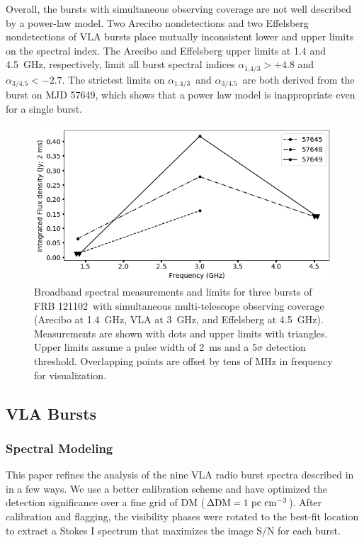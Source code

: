 \documentclass[twocolumn]{aastex61}
\newcommand{\frb}{FRB 121102}
\begin{document}
Overall, the bursts with simultaneous observing coverage are not well described by a power-law model. Two Arecibo nondetections and two Effelsberg nondetections of VLA bursts place mutually inconsistent lower and upper limits on the spectral index. The Arecibo and Effelsberg upper limits at 1.4 and 4.5~GHz, respectively, limit all burst spectral indices $\alpha_{1.4/3}>+4.8$ and $\alpha_{3/4.5}<-2.7$. The strictest limits on $\alpha_{1.4/3}$\ and $\alpha_{3/4.5}$\ are both derived from the burst on MJD 57649, which shows that a power law model is inappropriate even for a single burst.

\begin{figure}[htb]
\begin{center}
 \includegraphics[width=\columnwidth]{multispec.png}
 \caption{Broadband spectral measurements and limits for three bursts of \frb\ with simultaneous multi-telescope observing coverage (Arecibo at 1.4~GHz, VLA at 3~GHz, and Effelsberg at 4.5~GHz). Measurements are shown with dots and upper limits with triangles. Upper limits assume a pulse width of 2~ms and a $5\sigma$ detection threshold. Overlapping points are offset by tens of MHz in frequency for visualization.
 \label{fig:multi}}
\end{center}
\end{figure}

\subsection{VLA Bursts}
\subsubsection{Spectral Modeling}
\label{sec:spec}

This paper refines the analysis of the nine VLA radio burst spectra described in \citet{LOC} in a few ways. We use a better calibration scheme and have optimized the detection significance over a fine grid of DM ($\Delta \rm{DM}=1\ \rm{pc}\ \rm{cm}^{-3}$). After calibration and flagging, the visibility phases were rotated to the best-fit location \citep[RA, Dec $=$ 05h31m58.70s, +33d08m52.5s;][]{LOC} to extract a Stokes I spectrum that maximizes the image S/N for each burst.
\end{document}
